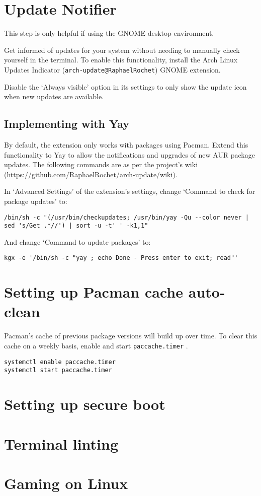 \documentclass[a4paper]{article}
\begin{document}
\section{Update Notifier}

This step is only helpful if using the GNOME desktop environment.

Get informed of updates for your system without needing to manually check yourself in the terminal.
To enable this functionality, install the Arch Linux Updates Indicator (\lstinline|arch-update@RaphaelRochet|) GNOME extension.

Disable the `Always visible' option in its settings to only show the update icon when new updates are available.

\subsection*{Implementing with Yay}

By default, the extension only works with packages using Pacman.
Extend this functionality to Yay to allow the notifications and upgrades of new AUR package updates.
The following commands are as per the project's wiki (\url{https://github.com/RaphaelRochet/arch-update/wiki}).

In `Advanced Settings' of the extension's settings, change `Command to check for package updates' to:
\begin{lstlisting}
/bin/sh -c "(/usr/bin/checkupdates; /usr/bin/yay -Qu --color never | sed 's/Get .*//') | sort -u -t' ' -k1,1"
\end{lstlisting}
And change `Command to update packages' to:
\begin{lstlisting}
kgx -e '/bin/sh -c "yay ; echo Done - Press enter to exit; read"'
\end{lstlisting}

\section{Setting up Pacman cache auto-clean}

Pacman's cache of previous package versions will build up over time.
To clear this cache on a weekly basis, enable and start \lstinline|paccache.timer| \cite{paccache-timer}.

\begin{lstlisting}
systemctl enable paccache.timer
systemctl start paccache.timer
\end{lstlisting}

\section{Setting up secure boot}

\section{Terminal linting}

\section{Gaming on Linux}



\end{document}
